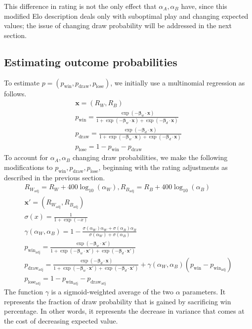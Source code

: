 \documentclass{article}
\newcommand{\pw}{p_{\text{win}}}
\newcommand{\pd}{p_{\text{draw}}}
\newcommand{\pl}{p_{\text{lose}}}
\newcommand{\Rw}{R_{W_{\text{adj}}}}
\newcommand{\Rb}{R_{B_{\text{adj}}}}
\begin{document}
This difference in rating is not the only effect that $\alpha_A,\alpha_B$ have,
since this modified Elo description deals only with suboptimal play and changing expected values;
the issue of changing draw probability will be addressed in the next section.

\subsection{Estimating outcome probabilities}
To estimate $p=(\pw,\pd,\pl)$, we initially use a multinomial regression as follows.
\begin{gather*}
    \bm{x} = (R_W, R_B)\\
    \pw = \frac{\exp(-\bm{\beta}_w \cdot \bm{x})}
    {1+\exp(-\bm{\beta}_w \cdot \bm{x}) + \exp(-\bm{\beta}_d \cdot \bm{x})} \\
    \pd = \frac{\exp(-\bm{\beta}_d \cdot \bm{x})}
    {1+\exp(-\bm{\beta}_w \cdot \bm{x}) + \exp(-\bm{\beta}_d \cdot \bm{x})} \\
    \pl = 1 - \pw - \pd
\end{gather*}
To account for $\alpha_A, \alpha_B$ changing draw probabilities, we make the following
modifications to $\pw,\pd,\pl$,
beginning with the rating adjustments as described in the previous section.
\begin{gather*}
    R_{W_{\text{adj}}} = R_W + 400\log_{10}(\alpha_W), R_{B_{\text{adj}}} = R_B + 400\log_{10}(\alpha_B) \\
    \bm{x}'=(\Rw, \Rb)\\
    \sigma(x) = \frac{1}{1+\exp(-x)} \\
    \gamma(\alpha_W, \alpha_B) = 1 - \frac{\sigma(\alpha_W)\alpha_W + \sigma(\alpha_B)\alpha_B}
    {\sigma(\alpha_W)+\sigma(\alpha_B)} \\
    p_{\text{win}_{\text{adj}}} = \frac{\exp(-\bm{\beta}_w \cdot \bm{x}')}
    {1+\exp(-\bm{\beta}_w \cdot \bm{x}') + \exp(-\bm{\beta}_d \cdot \bm{x}')} \\
    p_{\text{draw}_{\text{adj}}} = \frac{\exp(-\bm{\beta}_d \cdot \bm{x})}
    {1+\exp(-\bm{\beta}_w \cdot \bm{x}') + \exp(-\bm{\beta}_d \cdot \bm{x}')}
    + \gamma(\alpha_W,\alpha_B)\left( \pw - p_{\text{win}_{\text{adj}}} \right)\\
    p_{\text{lose}_{\text{adj}}} = 1- p_{\text{win}_{\text{adj}}} - p_{\text{draw}_{\text{adj}}}
\end{gather*}
The function $\gamma$ is a sigmoid-weighted average of the two $\alpha$ parameters.
It represents the fraction of draw probability that is gained by sacrificing win percentage.
In other words, it represents the decrease in variance that comes at the cost of decreasing
expected value.
\end{document}
